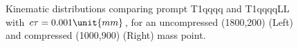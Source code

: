 \begin{figure}[h!]
\begin{center}
     \\
     ~
    \caption{Kinematic distributions comparing prompt T1qqqq and
      T1qqqqLL with $\ctau = 0.001\unit{mm}$, for an uncompressed
      (1800,200) (Left) and compressed (1000,900) (Right) mass point.}
    \label{fig:T1qqqqLLvsT1qqqq}
  \end{center}
\end{figure}

